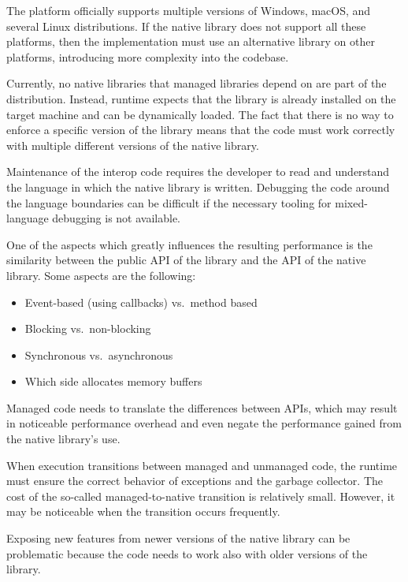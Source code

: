 \begin{itemize}

     The \dotnet{} platform officially supports
    multiple versions of Windows, macOS, and several Linux distributions. If the native library does
    not support all these platforms, then the implementation must use an alternative library on
    other platforms, introducing more complexity into the codebase.

     Currently, no native libraries that managed
    \dotnet{} libraries depend on are part of the \dotnet{} distribution. Instead, \dotnet{} runtime
    expects that the library is already installed on the target machine and can be dynamically
    loaded. The fact that there is no way to enforce a specific version of the library means that
    the \dotnet{} code must work correctly with multiple different versions of the native library.

     Maintenance of the interop code requires the developer to read and
    understand the language in which the native library is written. Debugging the code around the
    language boundaries can be difficult if the necessary tooling for mixed-language debugging is
    not available.

     One of the aspects which greatly influences the resulting performance is
    the similarity between the public API of the \dotnet{} library and the API of the native
    library. Some aspects are the following:

    \begin{itemize}
      \item Event-based (using callbacks) vs.\ method based
      \item Blocking vs.\ non-blocking
      \item Synchronous vs.\ asynchronous
      \item Which side allocates memory buffers
    \end{itemize}

    Managed code needs to translate the differences between APIs, which may result in noticeable
    performance overhead and even negate the performance gained from the native library's use.

     When execution transitions between managed and unmanaged code,
    the runtime must ensure the correct behavior of exceptions and the garbage collector. The cost
    of the so-called managed-to-native transition is relatively small. However, it may be noticeable
    when the transition occurs frequently.

     Exposing new features from newer versions of the native library can
    be problematic because the code needs to work also with older versions of the library.

\end{itemize}

